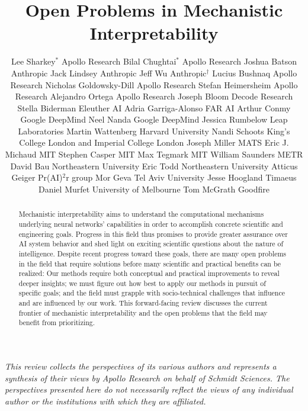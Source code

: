\documentclass[10pt]{article} %
\title{Open Problems in Mechanistic Interpretability}
\author{\name Lee Sharkey$^*$ \aff Apollo Research
      \AND
      \name Bilal Chughtai$^*$ \aff Apollo Research
      \AND
      \name Joshua Batson \aff Anthropic
      \AND
      \name Jack Lindsey \aff Anthropic
      \AND
      \name Jeff Wu \aff Anthropic$^\dagger$
      \AND
      \name Lucius Bushnaq \aff Apollo Research
      \AND
      \name Nicholas Goldowsky-Dill \aff Apollo Research
      \AND
      \name Stefan Heimersheim \aff Apollo Research
      \AND
      \name Alejandro Ortega \aff Apollo Research
      \AND
      \name Joseph Bloom \aff Decode Research
      \AND
      \name Stella Biderman \aff Eleuther AI
      \AND
      \name Adria Garriga-Alonso \aff FAR AI
      \AND
      \name Arthur Conmy \aff Google DeepMind
      \AND
      \name Neel Nanda \aff Google DeepMind
      \AND
      \name Jessica Rumbelow \aff Leap Laboratories
      \AND
      \name Martin Wattenberg \aff Harvard University
      \AND
      \name Nandi Schoots \aff King's College London and Imperial College London
      \AND
      \name Joseph Miller \aff MATS
      \AND
      \name Eric J. Michaud \aff MIT
      \AND
      \name Stephen Casper \aff MIT
      \AND
      \name Max Tegmark \aff MIT
      \AND
      \name William Saunders \aff METR
      \AND
      \name David Bau \aff Northeastern University
      \AND
      \name Eric Todd \aff Northeastern University
      \AND
      \name Atticus Geiger \aff Pr(AI)$^2$r group
      \AND
      \name Mor Geva \aff Tel Aviv University
      \AND
      \name Jesse Hoogland \aff Timaeus
      \AND
      \name Daniel Murfet \aff University of Melbourne
      \AND
      \name Tom McGrath \aff Goodfire
      }
\begin{document}
\maketitle

\newpage

\vspace*{\fill}
\begin{center}
\begin{abstract}
Mechanistic interpretability aims to understand the computational mechanisms underlying neural networks' capabilities in order to accomplish concrete scientific and engineering goals. Progress in this field thus promises to provide greater assurance over AI system behavior and shed light on exciting scientific questions about the nature of intelligence. Despite recent progress toward these goals, there are many open problems in the field that require solutions before many scientific and practical benefits can be realized: Our methods require both conceptual and practical improvements to reveal deeper insights; we must figure out how best to apply our methods in pursuit of specific goals; and the field must grapple with socio-technical challenges that influence and are influenced by our work. This forward-facing review discusses the current frontier of mechanistic interpretability and the open problems that the field may benefit from prioritizing. 
\end{abstract}
\end{center}
\vspace*{\fill}

\textit{This review collects the perspectives of its various authors and represents a synthesis of their views by Apollo Research on behalf of Schmidt Sciences. The perspectives presented here do not necessarily reflect the views of any individual author or the institutions with which they are affiliated.}


\newpage
\tableofcontents
\newpage








\end{document}
